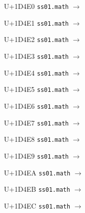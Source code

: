 \documentclass{article}
\begin{document}
\begin{substitutions}
\goodbreak

U+1D4E0  \linebreak
    \texttt{ss01.math} $\to$  

\goodbreak

U+1D4E1  \linebreak
    \texttt{ss01.math} $\to$  

\goodbreak

U+1D4E2  \linebreak
    \texttt{ss01.math} $\to$  

\goodbreak

U+1D4E3  \linebreak
    \texttt{ss01.math} $\to$  

\goodbreak

U+1D4E4  \linebreak
    \texttt{ss01.math} $\to$  

\goodbreak

U+1D4E5  \linebreak
    \texttt{ss01.math} $\to$  

\goodbreak

U+1D4E6  \linebreak
    \texttt{ss01.math} $\to$  

\goodbreak

U+1D4E7  \linebreak
    \texttt{ss01.math} $\to$  

\goodbreak

U+1D4E8  \linebreak
    \texttt{ss01.math} $\to$  

\goodbreak

U+1D4E9  \linebreak
    \texttt{ss01.math} $\to$  

\goodbreak

U+1D4EA  \linebreak
    \texttt{ss01.math} $\to$  

\goodbreak

U+1D4EB  \linebreak
    \texttt{ss01.math} $\to$  

\goodbreak

U+1D4EC  \linebreak
    \texttt{ss01.math} $\to$  


\end{substitutions}
\end{document}
